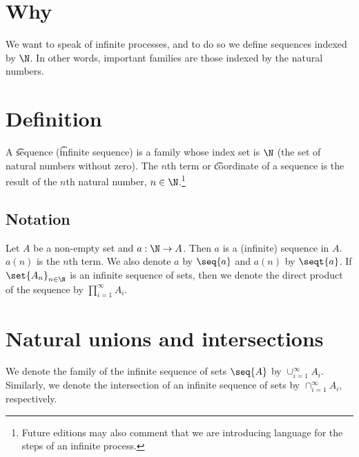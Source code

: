 

\section*{Why}

We want to speak of infinite processes, and to do so we define sequences indexed by $\N  $.
In other words, important families are those indexed by the natural numbers.

\section*{Definition}

A \t{sequence} (\t{infinite sequence}) is a family whose index set is $\N  $ (the set of natural numbers without zero).
The \t{$n$th term} or \t{coordinate} of a sequence is the result of the $n$th natural number, $n \in \N  $.\footnote{Future editions may also comment that we are introducing language for the steps of an infinite process.}

\subsection*{Notation}

Let $A$ be a non-empty set and $a: \N   \to A$.
Then $a$ is a (infinite) sequence in $A$.
$a(n)$ is the $n$th term.
We also denote $a$ by $\seq{a}$ and $a(n)$ by $\seqt{a}$.
If $\set{A_n}_{n \in \N  }$ is an infinite sequence of sets, then we denote the direct product of the sequence by $\prod_{i = 1}^{\infty} A_i$.

\section*{Natural unions and intersections}

We denote the family of the infinite sequence of sets $\seq{A}$ by $\cup_{i = 1}^{\infty} A_i$.
Similarly, we denote the intersection of an infinite sequence of sets by $\cap _{i = 1}^{\infty} A_i$, respectively.

\blankpage